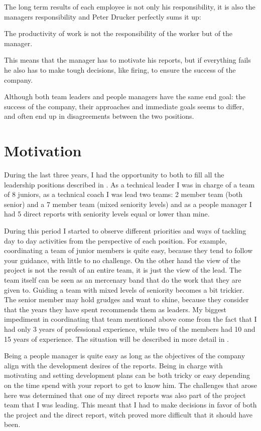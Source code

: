 The long term results of each employee is not only his responsibility, it is also the managers responsibility and Peter Drucker perfectly sums it up:
\begin{displayquote}
The productivity of work is not the responsibility of the worker but of the manager.
\end{displayquote}
This means that the manager has to motivate his reports, but if everything fails he also has to make tough decisions, like firing, to ensure the success of the company.

Although both team leaders and people managers have the same end goal: the success of the company, their approaches and immediate goals seems to differ, and often end up in disagreements between the two positions.
 
\section{Motivation}
\label{sec:motivation}
During the last three years, I had the opportunity to both to fill all the leadership positions described in . As a technical leader I was in charge of a team of 8 juniors, as a technical coach I was lead two teams: 2 member team (both senior) and a 7 member team (mixed seniority levels) and as a people manager I had 5 direct reports with seniority levels equal or lower than mine. 

During this period I started to observe different priorities and ways of tackling day to day activities from the perspective of each position. For example, coordinating a team of junior members is quite easy, because they tend to follow your guidance, with little to no challenge. On the other hand the view of the project is not the result of an entire team, it is just the view of the lead. The team itself can be seen as an mercenary band that do the work that they are given to.
Guiding a team with mixed levels of seniority becomes a bit trickier. The senior member may hold grudges and want to shine, because they consider that the years they have spent recommends them as leaders. My biggest impediment in coordinating that team mentioned above come from the fact that I had only 3 years of professional experience, while two of the members had 10 and 15 years of experience. The situation will be described in more detail in .

Being a people manager is quite easy as long as the objectives of the company align with the development desires of the reports. Being in charge with motivating and setting development plans can be both tricky or easy depending on the time spend with your report to get to know him. The challenges that arose here was determined that one of my direct reports was also part of the project team that I was leading. This meant that I had to make decisions in favor of both the project and the direct report, witch proved more difficult that it should have been.

